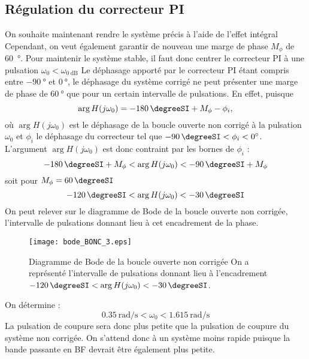 \subsection*{Régulation du correcteur PI}
On souhaite maintenant rendre le système précis à l'aide de l'effet intégral
Cependant, on veut également garantir de nouveau une marge de phase $M_\phi$ de 
\SI{60}{\degree}. Pour maintenir le système stable, il faut donc centrer le 
correcteur PI à une pulsation $\omega_0<\omega_{\SI{0}{\dB}}$
Le déphasage apporté par le correcteur PI étant compris entre 
$\SI{-90}{\degree}$ et $\SI{0}{\degree}$, le déphasage du système 
corrigé ne peut présenter une marge de phase de $\SI{60}{\degree}$ que pour 
un certain intervalle de pulsations. En effet, puisque
\[
    \arg{H(j\omega_0)}=\SI{-180}{\degreeSI}+M_\phi-\phi_i,
\]
où $\arg{H(j\omega_0)}$ est le déphasage de la boucle ouverte non 
corrigé à la pulsation $\omega_0$ et $\phi_i$ le déphasage du 
correcteur tel que $\SI{-90}{\degreeSI}<\phi_i<\SI{0}{\degree}$. 
L'argument $\arg{H(j\omega_0)}$ est donc contraint par les 
bornes de $\phi_i$ :
\[
    \SI{-180}{\degreeSI}+M_\phi<\arg{H(j\omega_0)}<\SI{-90}{\degreeSI}+M_\phi
\]
soit pour $M_\phi=\SI{60}{\degreeSI}$
\[
    \SI{-120}{\degreeSI}<\arg{H(j\omega_0)}<\SI{-30}{\degreeSI}
\]
On peut relever sur le diagramme de Bode de la boucle ouverte non corrigée,
l'intervalle de pulsations donnant lieu à cet encadrement de la phase.
\begin{figure}
    \centering
    \texttt{[image: bode\_BONC\_3.eps]}
    \caption{Diagramme de Bode de la boucle ouverte non corrigée
             On a représenté l'intervalle de pulsations donnant 
             lieu à l'encadrement
             $\SI{-120}{\degreeSI}<\arg{H(j\omega_0)}<\SI{-30}{\degreeSI}$.}
\end{figure}
On détermine :
\[
    \SI{0.35}{\radian\per\second}<\omega_0<\SI{1.615}{\radian\per\second}
\]
La pulsation de coupure sera donc plus petite que la pulsation de coupure
du système non corrigée. On s'attend donc à un système moins rapide puisque la 
bande passante en BF devrait être également plus petite.


